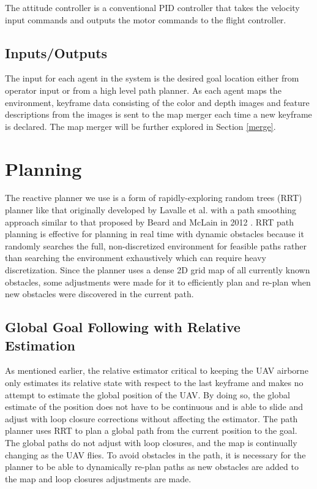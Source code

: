\documentclass[letterpaper, 10 pt, conference]{ieeeconf}  %
\begin{document}
The attitude controller is a conventional PID controller that takes the velocity input commands and outputs the motor commands to the flight controller.

\subsection{Inputs/Outputs}

The input for each agent in the system is the desired goal location either from operator input or from a high level path planner. As each agent maps the environment, keyframe data consisting of the color and depth images and feature descriptions from the images is sent to the map merger each time a new keyframe is declared. The map merger will be further explored in Section \ref{merge}.

\section{Planning}\label{planning}

The reactive planner we use is a form of rapidly-exploring random trees (RRT) planner like that originally developed by Lavalle et al. \cite{Lavalle1998} with a path smoothing approach similar to that proposed by Beard and McLain in 2012 \cite{Beard2012}. RRT path planning is effective for planning in real time with dynamic obstacles because it randomly searches the full, non-discretized environment for feasible paths rather than searching the environment exhaustively which can require heavy discretization. Since the planner uses a dense 2D grid map of all currently known obstacles, some adjustments were made for it to efficiently plan and re-plan when new obstacles were discovered in the current path.

\subsection{Global Goal Following with Relative Estimation}

As mentioned earlier, the relative estimator critical to keeping the UAV airborne only estimates its relative state with respect to the last keyframe and makes no attempt to estimate the global position of the UAV. By doing so, the global estimate of the position does not have to be continuous and is able to slide and adjust with loop closure corrections without affecting the estimator. The path planner uses RRT to plan a global path from the current position to the goal. The global paths do not adjust with loop closures, and the map is continually changing as the UAV flies. To avoid obstacles in the path, it is necessary for the planner to be able to dynamically re-plan paths as new obstacles are added to the map and loop closures adjustments are made.
\end{document}
